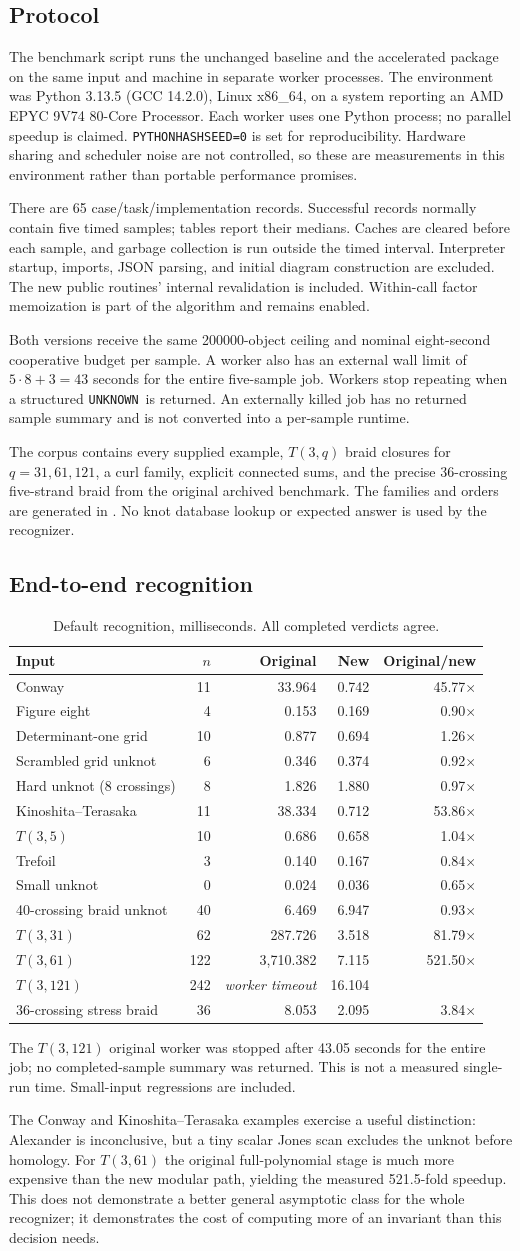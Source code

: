 \documentclass[11pt,letterpaper]{article}
\theoremstyle{definition}
\newcommand{\UNKNOWN}{\texttt{UNKNOWN}}
\newcommand{\PipelineTable}{
\begin{table}[htbp]
\centering\small
\caption{Default recognition, milliseconds. All completed verdicts agree.}
\label{tab:pipeline}
\begin{tabular}{lrrrr}
\toprule
Input & $n$ & Original & New & Original/new \\
\midrule
Conway & 11 & 33.964 & 0.742 & 45.77$\times$ \\
Figure eight & 4 & 0.153 & 0.169 & 0.90$\times$ \\
Determinant-one grid & 10 & 0.877 & 0.694 & 1.26$\times$ \\
Scrambled grid unknot & 6 & 0.346 & 0.374 & 0.92$\times$ \\
Hard unknot (8 crossings) & 8 & 1.826 & 1.880 & 0.97$\times$ \\
Kinoshita--Terasaka & 11 & 38.334 & 0.712 & 53.86$\times$ \\
$T(3,5)$ & 10 & 0.686 & 0.658 & 1.04$\times$ \\
Trefoil & 3 & 0.140 & 0.167 & 0.84$\times$ \\
Small unknot & 0 & 0.024 & 0.036 & 0.65$\times$ \\
40-crossing braid unknot & 40 & 6.469 & 6.947 & 0.93$\times$ \\
$T(3,31)$ & 62 & 287.726 & 3.518 & 81.79$\times$ \\
$T(3,61)$ & 122 & 3,710.382 & 7.115 & 521.50$\times$ \\
$T(3,121)$ & 242 & \textit{worker timeout} & 16.104 & \textemdash \\
36-crossing stress braid & 36 & 8.053 & 2.095 & 3.84$\times$ \\
\bottomrule
\end{tabular}
\par\smallskip
\begin{minipage}{0.97\linewidth}\footnotesize The $T(3,121)$ original worker was stopped after 43.05 seconds for the entire job; no completed-sample summary was returned. This is not a measured single-run time. Small-input regressions are included.\end{minipage}
\end{table}

}
\begin{document}
\subsection{Protocol}

The benchmark script runs the unchanged baseline and the accelerated package
on the same input and machine in separate worker processes. The environment was
Python 3.13.5 (GCC 14.2.0), Linux x86\_64, on a system reporting an AMD EPYC 9V74
80-Core Processor. Each worker uses one Python process; no parallel speedup is
claimed. \texttt{PYTHONHASHSEED=0} is set for reproducibility. Hardware sharing
and scheduler noise are not controlled, so these are measurements in this
environment rather than portable performance promises.

There are 65 case/task/implementation records. Successful records normally
contain five timed samples; tables report their medians. Caches are cleared
before each sample, and garbage collection is run outside the timed interval.
Interpreter startup, imports, JSON parsing, and initial diagram construction
are excluded. The new public routines' internal revalidation is included.
Within-call factor memoization is part of the algorithm and remains enabled.

Both versions receive the same 200000-object ceiling and nominal eight-second
cooperative budget per sample. A worker also has an external wall limit of
$5\cdot8+3=43$ seconds for the entire five-sample job. Workers stop repeating
when a structured \UNKNOWN\ is returned. An externally killed job has no
returned sample summary and is not converted into a per-sample runtime.

The corpus contains every supplied example, $T(3,q)$ braid closures for
$q=31,61,121$, a curl family, explicit connected sums, and the precise 36-crossing
five-strand braid from the original archived benchmark. The families and orders
are generated in . No knot database lookup or expected
answer is used by the recognizer.

\subsection{End-to-end recognition}
\PipelineTable

The Conway and Kinoshita--Terasaka examples exercise a useful distinction:
Alexander is inconclusive, but a tiny scalar Jones scan excludes the unknot
before homology. For $T(3,61)$ the original full-polynomial stage is much more
expensive than the new modular path, yielding the measured 521.5-fold speedup.
This does not demonstrate a better general asymptotic class for the whole
recognizer; it demonstrates the cost of computing more of an invariant than
this decision needs.
\end{document}
